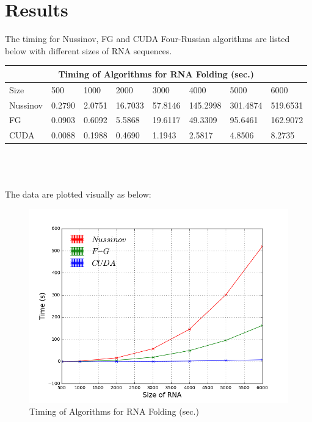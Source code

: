 \documentclass[12pt]{article}
\begin{document}
\section{Results}
The timing for Nussinov, FG and CUDA Four-Russian algorithms are listed below with different sizes of RNA sequences.\\
\begin{tabular}{ |p{1.5cm}||p{1.2cm}|p{1.3cm}|p{1.3cm}|p{1.4cm}|p{1.4cm}|p{1.4cm}|p{1.6cm}|  }
 \hline
 \multicolumn{8}{|c|}{Timing of Algorithms for RNA Folding (sec.)} \\
 \hline
 Size& 500& 1000& 2000& 3000& 4000& 5000& 6000\\
 \hline
 Nussinov& 0.2790& 2.0751& 16.7033& 57.8146& 145.2998& 301.4874&	519.6531\\
 FG& 0.0903& 0.6092& 5.5868& 19.6117& 49.3309& 95.6461& 162.9072\\
 CUDA& 0.0088& 0.1988& 0.4690& 1.1943& 2.5817& 4.8506& 8.2735\\
 \hline
\end{tabular}\\
\\
\\
The data are plotted visually as below:
\begin{figure}[ht!]
  \centering
  \includegraphics[keepaspectratio, scale=.92]{algorithmGraph.png}
  \caption{Timing of Algorithms for RNA Folding (sec.)}
  \label{fig:Timing_Algorithm}
\end{figure}
\end{document}
